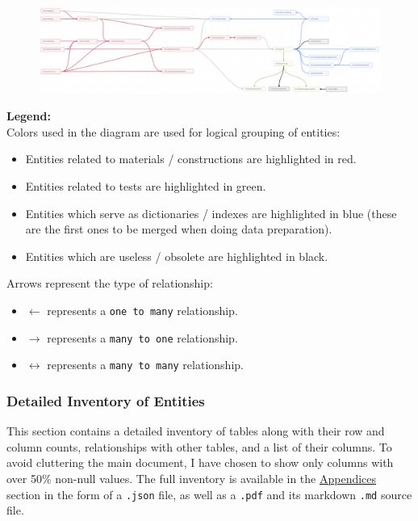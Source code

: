 \begin{figure}[h!]
\centering
\includegraphics[width=\textwidth]{Images/er_diagram.png}
\end{figure}

\textbf{Legend:} \\
Colors used in the diagram are used for logical grouping of entities:
\begin{itemize}
    \item Entities related to materials / constructions are highlighted in red.
    \item Entities related to tests are highlighted in green.
    \item Entities which serve as dictionaries / indexes are highlighted in blue (these are the first ones to be merged when doing data preparation).
    \item Entities which are useless / obsolete are highlighted in black.
\end{itemize}

Arrows represent the type of relationship:
\begin{itemize}
    \item $\longleftarrow$ represents a \texttt{one to many} relationship.
    \item $\longrightarrow$ represents a \texttt{many to one} relationship.
    \item $\longleftrightarrow$ represents a \texttt{many to many} relationship.
\end{itemize}

\subsubsection{Detailed Inventory of Entities}

This section contains a detailed inventory of tables along with their row and column counts, relationships with other tables, and a list of their columns. To avoid cluttering the main document, I have chosen to show only columns with over 50\% non-null values. The full inventory is available in the \hyperref[Appendices]{Appendices} section in the form of a \texttt{.json} file, as well as a \texttt{.pdf} and its markdown \texttt{.md} source file.

